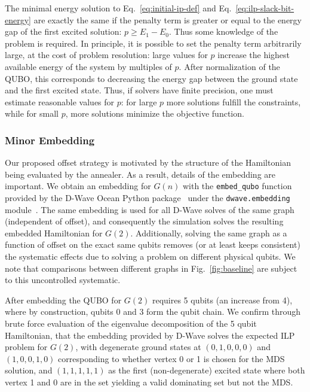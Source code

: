 \documentclass[10pt]{iopart}
\begin{document}
The minimal energy solution to Eq.~\eqref{eq:initial-ip-def} and Eq.~\eqref{eq:ilp-slack-bit-energy} are exactly the same if the penalty term is greater or equal to the energy gap of the first excited solution: $p \geq E_1 - E_0$.
Thus some knowledge of the problem is required.
In principle, it is possible to set the penalty term arbitrarily large, at the cost of problem resolution: large values for $p$ increase the highest available energy of the system by multiples of $p$.
After normalization of the QUBO, this corresponds to decreasing the energy gap between the ground state and the first excited state.
Thus, if solvers have finite precision, one must estimate reasonable values for $p$: for large $p$ more solutions fulfill the constraints, while for small $p$, more solutions minimize the objective function.

\subsubsection{Minor Embedding}
\label{sec:methods:minor_embedding}
Our proposed offset strategy is motivated by the structure of the Hamiltonian being evaluated by the annealer.
As a result, details of the embedding are important. We obtain an embedding for $G(n)$ with the \texttt{embed\_qubo} function provided by the D-Wave Ocean Python package~\cite{dwave_oceans} under the \texttt{dwave.embedding} module~\cite{2008arXiv0804.4884C}.
The same embedding is used for all D-Wave solves of the same graph (independent of offset), and consequently the simulation solves the resulting embedded Hamiltonian for $G(2)$.
Additionally, solving the same graph as a function of offset on the exact same qubits removes (or at least keeps consistent) the systematic effects due to solving a problem on different physical qubits.
We note that comparisons between different graphs in Fig.~\ref{fig:baseline} are subject to this uncontrolled systematic.

After embedding the QUBO for $G(2)$ requires 5 qubits (an increase from 4), where by construction, qubits 0 and 3 form the qubit chain.
We confirm through brute force evaluation of the eigenvalue decomposition of the 5 qubit Hamiltonian, that the embedding provided by D-Wave solves the expected ILP problem for $G(2)$, with degenerate ground states at $(0, 1, 0, 0, 0)$ and $(1, 0, 0, 1, 0)$ corresponding to whether vertex 0 or 1 is chosen for the MDS solution, and $(1, 1, 1, 1, 1)$ as the first (non-degenerate) excited state where both vertex 1 and 0 are in the set yielding a valid dominating set but not the MDS.
\end{document}
